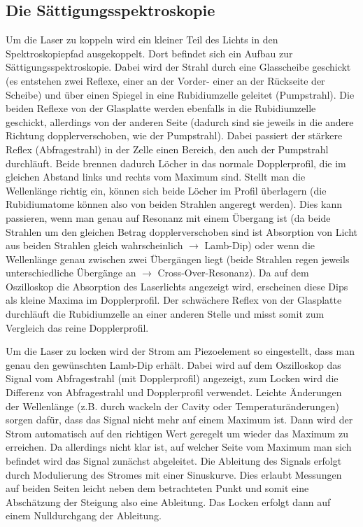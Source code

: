 \documentclass[12pt, a4paper]{article}
\begin{document}
  \subsection{Die Sättigungsspektroskopie}
    Um die Laser zu koppeln wird ein kleiner Teil des Lichts in den
    Spektroskopiepfad ausgekoppelt. Dort befindet sich ein Aufbau zur
    Sättigungsspektroskopie. Dabei wird der Strahl durch eine Glasscheibe geschickt
    (es entstehen zwei Reflexe, einer an der Vorder- einer an der Rückseite der
    Scheibe) und über einen Spiegel in eine Rubidiumzelle geleitet (Pumpstrahl). Die
    beiden Reflexe von der Glasplatte werden ebenfalls in die Rubidiumzelle geschickt,
    allerdings von der anderen Seite (dadurch sind sie jeweils in die andere Richtung
    dopplerverschoben, wie der Pumpstrahl). Dabei passiert der stärkere Reflex
    (Abfragestrahl) in der Zelle einen Bereich, den auch der Pumpstrahl durchläuft.
    Beide brennen dadurch Löcher in das normale Dopplerprofil, die im gleichen
    Abstand links und rechts vom Maximum sind. Stellt man die Wellenlänge richtig ein,
    können sich beide Löcher im Profil überlagern (die Rubidiumatome können also von
    beiden Strahlen angeregt werden). Dies kann passieren, wenn man genau auf
    Resonanz mit einem Übergang ist (da beide Strahlen um den gleichen Betrag
    dopplerverschoben sind ist Absorption von Licht aus beiden Strahlen gleich
    wahrscheinlich $\rightarrow$ Lamb-Dip) oder wenn die Wellenlänge genau zwischen
    zwei Übergängen liegt (beide Strahlen regen jeweils unterschiedliche Übergänge an
    $\rightarrow$ Cross-Over-Resonanz). Da auf dem Oszilloskop die Absorption des
    Laserlichts angezeigt wird, erscheinen diese Dips als kleine Maxima im
    Dopplerprofil. Der schwächere Reflex von der Glasplatte durchläuft die
    Rubidiumzelle an einer anderen Stelle und misst somit zum Vergleich das reine
    Dopplerprofil.
    
    Um die Laser zu locken wird der Strom am Piezoelement so eingestellt, dass man
    genau den gewünschten Lamb-Dip erhält. Dabei wird auf dem Oszilloskop das
    Signal vom Abfragestrahl (mit Dopplerprofil) angezeigt, zum Locken wird die
    Differenz von Abfragestrahl und Dopplerprofil verwendet. Leichte Änderungen der
    Wellenlänge (z.B. durch wackeln der Cavity oder Temperaturänderungen) sorgen
    dafür, dass das Signal nicht mehr auf einem Maximum ist. Dann wird der Strom
    automatisch auf den richtigen Wert geregelt um wieder das Maximum zu erreichen.
    Da allerdings nicht klar ist, auf welcher Seite vom Maximum man sich befindet
    wird das Signal zunächst abgeleitet. Die Ableitung des Signals erfolgt durch
    Modulierung des Stromes mit einer Sinuskurve. Dies erlaubt Messungen auf beiden
    Seiten leicht neben dem betrachteten Punkt und somit eine Abschätzung der Steigung
    also eine Ableitung. Das Locken erfolgt dann auf einem Nulldurchgang der Ableitung.
\end{document}
